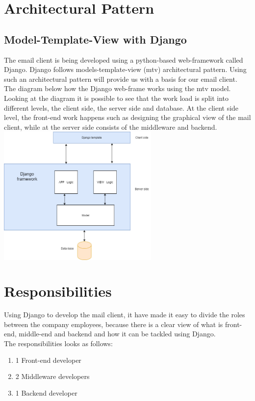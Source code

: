 \documentclass{article}
\begin{document}
\newpage

\section*{Architectural Pattern}

\subsection*{Model-Template-View with Django}

The email client is being  developed using a python-based web-framework called Django. Django follows models-template-view (mtv) architectural pattern. Using such an architectural pattern will provide us with a basis for our email client. The diagram below how the Django web-frame works using the mtv model. Looking at the diagram it is possible to see that the work load is split into different levels, the client side, the server side and database. At the client side level, the front-end work happens such as designing the graphical view of the mail client, while at the server side consists of the middleware and backend. 
\includegraphics[width=300px, keepaspectratio]{Django.png}\\[1cm]
\vspace{-15 mm}


\newpage

\section*{Responsibilities}
Using Django to develop the mail client, it have made it easy to divide the roles between the company employees, because there is a clear view of what is front-end, middle-end and backend and how it can be tackled using Django. \\

The responsibilities looks as follows:
\begin{enumerate}
    \item 1 Front-end developer
    \item 2 Middleware developers
    \item 1 Backend developer
\end{enumerate}

\newpage


\printindex[Alphabetical]
\printindex[Models]
\end{document}
